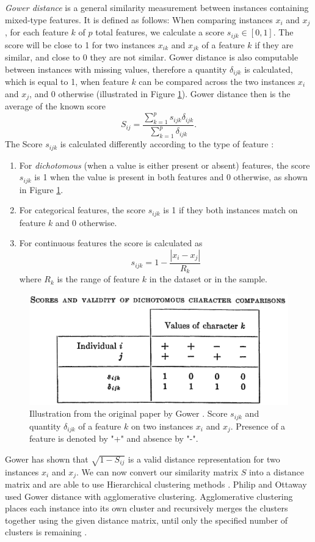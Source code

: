 \textit{Gower distance} \cite{gower} is a general similarity measurement between instances containing mixed-type features. It is defined as follows: When comparing instances $x_i$ and $x_j$, for each feature $k$ of $p$ total features, we calculate a score $s_{ijk} \in [0,1]$. The score will be close to 1 for two instances $x_{ik}$ and $x_{jk}$ of a feature $k$ if they are similar, and close to 0 they are not similar.
Gower distance is also computable between instances with missing values, therefore a quantity $\delta_{ijk}$ is calculated, which is equal to 1, when feature $k$ can be compared across the two instances $x_i$ and $x_j$, and 0 otherwise (illustrated in Figure \ref{gower_dichotomous}).
Gower distance then is the average of the known score
$$S_{ij} = \frac{\sum^p_{k=1}s_{ijk}\delta_{ijk}}{\sum^p_{k=1}\delta_{ijk}}.$$
The Score $s_{ijk}$ is calculated differently according to the type of feature \cite{gower}:
\begin{enumerate}
	\item For \textit{dichotomous} (when a value is either present or absent) features, the score $s_{ijk}$ is 1 when the value is present in both features and 0 otherwise, as shown in Figure \ref{gower_dichotomous}.
	\item For categorical features, the score $s_{ijk}$ is 1 if they both instances match on feature $k$ and 0 otherwise.
	\item For continuous features the score is calculated as
	$$s_{ijk} = 1-\frac{|x_i-x_j|}{R_k}$$
	where $R_k$ is the range of feature $k$ in the dataset or in the sample.
\end{enumerate}
\begin{figure}
\centering
	\includegraphics[width=\linewidth]{gower-dichotomous.png}
	\caption{Illustration from the original paper by Gower \cite{gower}. Score $s_{ijk}$ and quantity $\delta_{ijk}$ of a feature $k$ on two instances $x_i$ and $x_j$. Presence of a feature is denoted by "+" and absence by "-".}
	\label{gower_dichotomous}
\end{figure}
Gower \cite{gower} has shown that $\sqrt{1- S_{ij}}$ is a valid distance representation for two instances $x_i$ and $x_j$. We can now convert our similarity matrix $S$ into a distance matrix and are able to use Hierarchical clustering methods \cite{algorithms_for_clustering_data}. Philip and Ottaway \cite{philip_ottaway} used Gower distance with agglomerative clustering. Agglomerative clustering places each instance into its own cluster and recursively merges the clusters together using the given distance matrix, until only the specified number of clusters is remaining \cite{algorithms_for_clustering_data}.


